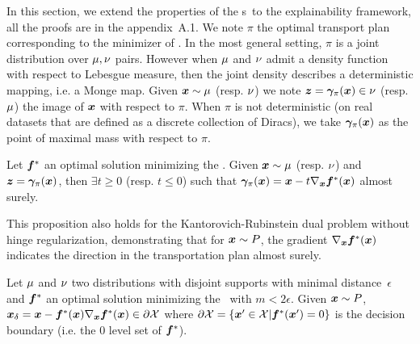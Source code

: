 In this section, we extend the properties of the \otnn s~to the explainability framework, all the proofs are in the appendix~A.1. We note $\pi$ the optimal transport plan corresponding to the minimizer of \losshkr. In the most general setting, $\pi$ is a joint distribution over $\mu,\nu$ pairs. However when $\mu$ and $\nu$ admit a density function~\cite{peyre2018computational} with respect to Lebesgue measure, then the joint density describes a deterministic mapping, i.e. a Monge map. Given $\bm{x} \sim \mu$ %
(resp. $\nu$) we note $\bm{z} = \bm{\gamma}_\pi(\bm{x}) \in \nu$ (resp. $\mu$) the image of $\bm{x}$ with respect to $\pi$. When $\pi$ is not deterministic (on real datasets that are defined as a discrete collection of Diracs), we take $\bm{\gamma}_\pi(\bm{x})$ as the point of maximal mass with respect to $\pi$.%


\begin{proposition}\label{th:gradient_transport_plan}
Let $\bm{f}^*$ an optimal solution minimizing the \losshkr. Given $\bm{x} \sim \mu$ (resp. $\nu$)  and  $\bm{z} = \bm{\gamma}_\pi(\bm{x})$, then $\exists t \geq 0$ (resp. $t \leq 0$) such that $\bm{\gamma}_\pi(\bm{x}) = \bm{x}  -t \nabla_{\bm{x}}  \bm{f}^*(\bm{x})$ almost surely. 
\end{proposition}

This proposition also holds for the Kantorovich-Rubinstein dual problem without hinge regularization, demonstrating that for $\bm{x} \sim P$,
 the gradient $\nabla_{\bm{x}} \bm{f}^{*}(\bm{x})$ indicates the direction in the transportation plan almost surely.

\begin{proposition}\label{boundary_distance}
Let $\mu$ and $\nu$ two distributions with disjoint supports with minimal distance~$\epsilon$ and  $\bm{f}^*$ an optimal solution minimizing the \losshkr~with $m<2\epsilon$. Given $\bm{x} \sim P$, %
$\bm{x}_\delta = \bm{x} -\bm{f}^*(\bm{x}) \nabla_{\bm{x}} \bm{f}^*(\bm{x}) \in \partial \mathcal{X} $
where $\partial \mathcal{X} = \left\{\bm{x}' \in \mathcal{X} | \bm{f}^*(\bm{x}') = 0 \right\}$  is the decision boundary (i.e. the 0 level set of $\bm{f}^*$).
\end{proposition}

